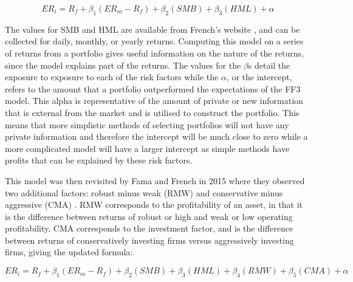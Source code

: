 \begin{equation*}
ER_i = R_f + \beta_1(ER_m -R_f) + \beta_2 (SMB) + \beta_3(HML) + \alpha
\end{equation*}

The values for SMB and HML are available from French's website \parencite{french_2022}, and can be collected for daily, monthly, or yearly returns. Computing this model on a series of returns from a portfolio gives useful information on the nature of the returns, since the model explains part of the returns. The values for the $\beta$s detail the exposure to exposure to each of the risk factors while the $\alpha$, or the intercept, refers to the amount that a portfolio outperformed the expectations of the FF3 model. This alpha is representative of the amount of private or new information that is external from the market and is utilised to construct the portfolio. This means that more simplistic methods of selecting portfolios will not have any private information and therefore the intercept will be much close to zero while a more complicated model will have a larger intercept as simple methods have profits that can be explained by these risk factors.

This model was then revisited by Fama and French in 2015 where they observed two additional factors: robust minus weak (RMW) and conservative minus aggressive (CMA) \parencite{ff5}. RMW corresponds to the profitability of an asset, in that it is the difference between returns of robust or high and weak or low operating profitability. CMA corresponds to the investment factor, and is the difference between returns of conservatively investing firms versus aggressively investing firms, giving the updated formula:

\begin{equation}
ER_i = R_f + \beta_1(ER_m -R_f) + \beta_2 (SMB) + \beta_3(HML) + \beta_4(RMW) + \beta_5(CMA) + \alpha
\end{equation}




